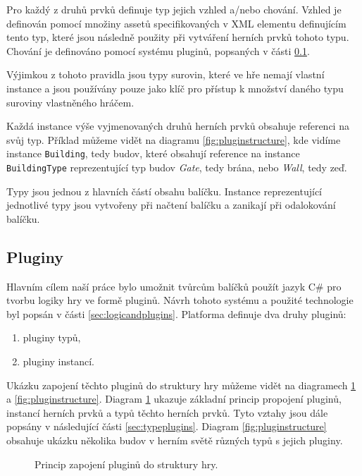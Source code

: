 Pro každý z druhů prvků definuje typ jejich vzhled a/nebo chování. Vzhled je definován pomocí množiny assetů specifikovaných v XML elementu definujícím tento typ, které jsou následně použity při vytváření herních prvků tohoto typu. Chování je definováno pomocí systému pluginů, popsaných v části \ref{sec:plugins}. 

Výjimkou z tohoto pravidla jsou typy surovin, které ve hře nemají vlastní instance a jsou používány pouze jako klíč pro přístup k množství daného typu suroviny vlastněného hráčem.

Každá instance výše vyjmenovaných druhů herních prvků obsahuje referenci na svůj typ. Příklad můžeme vidět na diagramu \ref{fig:pluginstructure}, kde vidíme instance \texttt{Building}, tedy budov, které obsahují reference na instance \texttt{BuildingType} reprezentující typ budov \textit{Gate}, tedy brána, nebo \textit{Wall}, tedy zeď.

Typy jsou jednou z hlavních částí obsahu balíčku. Instance reprezentující jednotlivé typy jsou vytvořeny při načtení balíčku a zanikají při odalokování balíčku. 

\subsection{Pluginy}
\label{sec:plugins}
Hlavním cílem naší práce bylo umožnit tvůrcům balíčků použít jazyk C\# pro tvorbu logiky hry ve formě pluginů. Návrh tohoto systému a použité technologie byl popsán v části \ref{sec:logicandplugins}. Platforma definuje dva druhy pluginů:

\begin{enumerate}
	\item pluginy typů,
	\item pluginy instancí.
\end{enumerate}

Ukázku zapojení těchto pluginů do struktury hry můžeme vidět na diagramech \ref{fig:simplepluginstructure} a \ref{fig:pluginstructure}. Diagram \ref{fig:simplepluginstructure} ukazuje základní princip propojení pluginů, instancí herních prvků a typů těchto herních prvků. Tyto vztahy jsou dále popsány v následující části \ref{sec:typeplugins}. Diagram \ref{fig:pluginstructure} obsahuje ukázku několika budov v herním světě různých typů s jejich pluginy.

\begin{figure}[h]
	\centering
	\fontsize{8pt}{11pt}\selectfont
	\def\svgwidth{\textwidth}
	
	\caption{Princip zapojení pluginů do struktury hry.}
	\label{fig:simplepluginstructure}
\end{figure}

